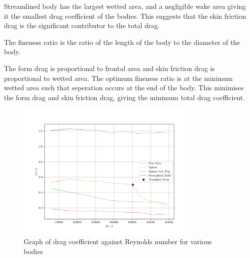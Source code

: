 \documentclass[8pt]{article}
\begin{document}
Streamlined body has the largest wetted area, and a negligible wake area giving it the smallest drag coefficient of the bodies. 
This suggests that the skin friction drag is the significant contributor to the total drag.


The fineness ratio is the ratio of the length of the body to the diameter of the body.

The form drag is proportional to frontal area and skin friction drag is proportional to wetted area.
The optimum fineness ratio is at the minimum wetted area such that seperation occurs at the end of the body.
This minimises the form drag and skin friction drag, giving the minimum total drag coefficient.



\begin{figure}[H]
    \centering
    \includegraphics[width=0.8\textwidth]{Re_vs_Cd.png}
    \caption{Graph of drag coefficient against Reynolds number for various bodies}
    \label{fig:figure1}
\end{figure}
\end{document}
